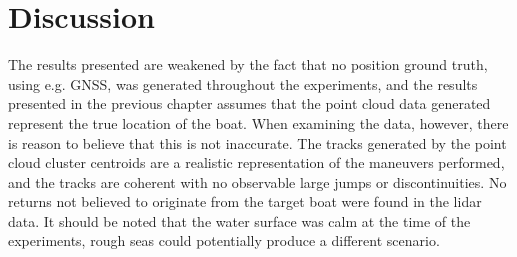 
\chapter{Discussion}
The results presented are weakened by the fact that no position ground truth, using e.g. GNSS, was generated throughout the experiments, and the results presented in the previous chapter assumes that the point cloud data generated represent the true location of the boat. When examining the data, however, there is reason to believe that this is not inaccurate. The tracks generated by the point cloud cluster centroids are a realistic representation of the maneuvers performed, and the tracks are coherent with no observable large jumps or discontinuities. No returns not believed to originate from the target boat were found in the lidar data. It should be noted that the water surface was calm at the time of the experiments, rough seas could potentially produce a different scenario.
